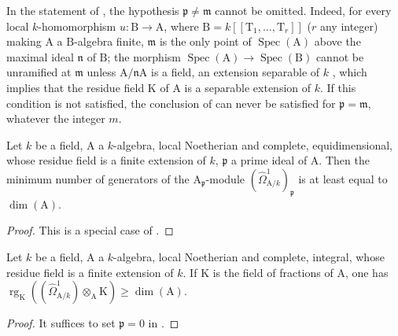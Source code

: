 \begin{remark}[18.11.6]
\label{IV.18.11.6}
In the statement of , the hypothesis $\mathfrak{p}\neq\mathfrak{m}$ cannot be omitted.
Indeed, for every local $k$-homomorphism $u:\mathrm{B}\to\mathrm{A}$, where $\mathrm{B}=k[[\mathrm{T}_1,\ldots,\mathrm{T}_r]]$ ($r$ any integer) making $\mathrm{A}$ a $\mathrm{B}$-algebra finite, $\mathfrak{m}$ is the only point of $\operatorname{Spec}(\mathrm{A})$ above the maximal ideal $\mathfrak{n}$ of $\mathrm{B}$; the morphism $\operatorname{Spec}(\mathrm{A})\to\operatorname{Spec}(\mathrm{B})$ cannot be unramified at $\mathfrak{m}$ unless $\mathrm{A}/\mathfrak{n}\mathrm{A}$ is a field, an extension separable of $k$ , which implies that the residue field $\mathrm{K}$ of $\mathrm{A}$ is a separable extension of $k$.
If this condition is not satisfied, the conclusion of  can never be satisfied for $\mathfrak{p}=\mathfrak{m}$, whatever the integer $m$.
\end{remark}

\begin{corollary}[18.11.7]
\label{IV.18.11.7}
Let $k$ be a field, $\mathrm{A}$ a $k$-algebra, local Noetherian and complete, equidimensional, whose residue field is a finite extension of $k$, $\mathfrak{p}$ a prime ideal of $\mathrm{A}$.
Then the minimum number of generators of the $\mathrm{A}_\mathfrak{p}$-module $(\hat{\Omega}^1_{\mathrm{A}/k})_\mathfrak{p}$ is at least equal to $\dim(\mathrm{A})$.
\end{corollary}

\begin{proof}
This is a special case of .
\end{proof}

\begin{corollary}[18.11.8]
\label{IV.18.11.8}
Let $k$ be a field, $\mathrm{A}$ a $k$-algebra, local Noetherian and complete, integral, whose residue field is a finite extension of $k$.
If $\mathrm{K}$ is the field of fractions of $\mathrm{A}$, one has $\operatorname{rg}_{\mathrm{K}}((\hat{\Omega}^1_{\mathrm{A}/k})\otimes_{\mathrm{A}}\mathrm{K})\geq\dim(\mathrm{A})$.
\end{corollary}

\begin{proof}
It suffices to set $\mathfrak{p}=0$ in .
\end{proof}

